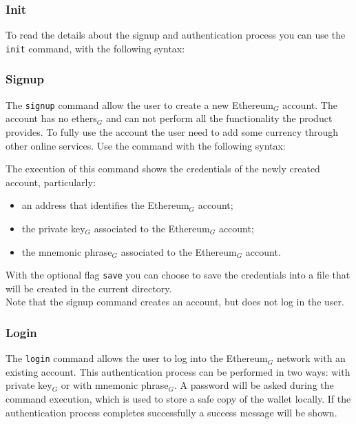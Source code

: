 \subsubsection{Init}
To read the details about the signup and authentication process you can use the \texttt{init} command, with the following syntax:
\begin{center}
\end{center}

\subsubsection{Signup}
The \texttt{signup} command allow the user to create a new Ethereum$_{G}$ account. The account has no ethers$_{G}$ and can not perform all the functionality the product provides.
To fully use the account the user need to add some currency through other online services.
Use the command with the following syntax:

\begin{center}
\end{center}

\noindent The execution of this command shows the credentials of the newly created account, particularly:
\begin{itemize}
	\item an address that identifies the Ethereum$_{G}$ account;
	\item the private key$_{G}$ associated to the Ethereum$_{G}$ account;
	\item the mnemonic phrase$_{G}$ associated to the Ethereum$_{G}$ account.
\end{itemize}
With the optional flag \texttt{save} you can choose to save the credentials into a file that will be created in the current directory. \\
Note that the signup command creates an account, but does not log in the user.

\subsubsection{Login}
The \texttt{login} command allows the user to log into the Ethereum$_{G}$ network with an existing account.
This authentication process can be performed in two ways: with private key$_{G}$ or with mnemonic phrase$_{G}$.
A password will be asked during the command execution, which is used to store a safe copy of the wallet locally. If the authentication process completes successfully a success message will be shown.

